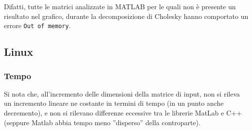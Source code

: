 \documentclass[11pt,italian]{article}
\begin{document}
Difatti, tutte le matrici analizzate in MATLAB per le quali non è presente un risultato nel grafico, durante la decomposizione di Cholesky hanno comportato un errore \lstinline{Out of memory}.
\begin{figure}[H]
	\label{fig:windows-memory}
\end{figure}

\subsection{Linux}
\subsubsection*{Tempo}
Si nota che, all'incremento delle dimensioni della matrice di input, non si rileva un incremento lineare ne costante in termini di tempo (in un punto anche decremento), e non si rilevano differenze eccessive tra le librerie MatLab e C++ (seppure Matlab abbia tempo meno ''disperso'' della controparte).
\begin{figure}[H]
\end{figure}
\end{document}
